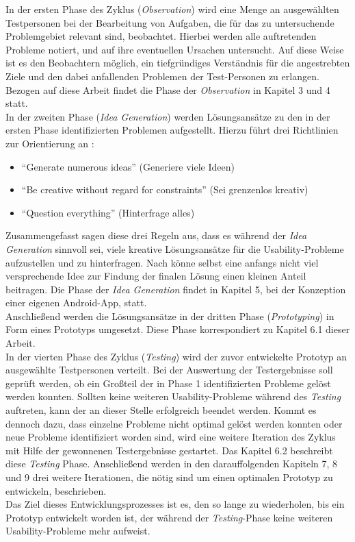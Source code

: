 \noindent
In der ersten Phase des Zyklus (\emph{Observation}) wird eine Menge an ausgewählten Testpersonen bei der Bearbeitung von Aufgaben, die für das zu untersuchende Problemgebiet relevant sind, beobachtet.
Hierbei werden alle auftretenden Probleme notiert, und auf ihre eventuellen Ursachen untersucht.
Auf diese Weise ist es den Beobachtern möglich, ein tiefgründiges Verständnis für die angestrebten Ziele und den dabei anfallenden Problemen der Test-Personen zu erlangen.
Bezogen auf diese Arbeit findet die Phase der \emph{Observation} in Kapitel 3 und 4 statt. \\

In der zweiten Phase (\emph{Idea Generation}) werden Lösungsansätze zu den in der ersten Phase identifizierten Problemen aufgestellt.
Hierzu führt \citeauthor{Norman13} drei Richtlinien zur Orientierung an \citep[Seite 226]{Norman13}:

\begin{itemize}
  \item ``Generate numerous ideas'' (Generiere viele Ideen)
  \item ``Be creative without regard for constraints'' (Sei grenzenlos kreativ)
  \item ``Question everything'' (Hinterfrage alles)
\end{itemize}

\noindent
Zusammengefasst sagen diese drei Regeln aus, dass es während der \emph{Idea Generation} sinnvoll sei, viele kreative Lösungsansätze für die Usability-Probleme aufzustellen und zu hinterfragen.
Nach \citeauthor{Norman13} könne selbst eine anfangs nicht viel versprechende Idee zur Findung der finalen Lösung einen kleinen Anteil beitragen.
Die Phase der \emph{Idea Generation} findet in Kapitel 5, bei der Konzeption einer eigenen Android-App, statt. \\

Anschließend werden die Lösungsansätze in der dritten Phase (\emph{Prototyping}) in Form eines Prototyps umgesetzt.
Diese Phase korrespondiert zu Kapitel 6.1 dieser Arbeit. \\

In der vierten Phase des Zyklus (\emph{Testing}) wird der zuvor entwickelte Prototyp an ausgewählte Testpersonen verteilt.
Bei der Auswertung der Testergebnisse soll geprüft werden, ob ein Großteil der in Phase 1 identifizierten Probleme gelöst werden konnten.
Sollten keine weiteren Usability-Probleme während des \emph{Testing} auftreten, kann der \hcdp{} an dieser Stelle erfolgreich beendet werden.
Kommt es dennoch dazu, dass einzelne Probleme nicht optimal gelöst werden konnten oder neue Probleme identifiziert worden sind, wird eine weitere Iteration des Zyklus mit Hilfe der gewonnenen Testergebnisse gestartet.
Das Kapitel 6.2 beschreibt diese \emph{Testing} Phase.
Anschließend werden in den darauffolgenden Kapiteln 7, 8 und 9 drei weitere Iterationen, die nötig sind um einen optimalen Prototyp zu entwickeln, beschrieben. \\

Das Ziel dieses Entwicklungsprozesses ist es, den \hcdp{} so lange zu wiederholen, bis ein Prototyp entwickelt worden ist, der während der \emph{Testing}-Phase keine weiteren Usability-Probleme mehr aufweist.
